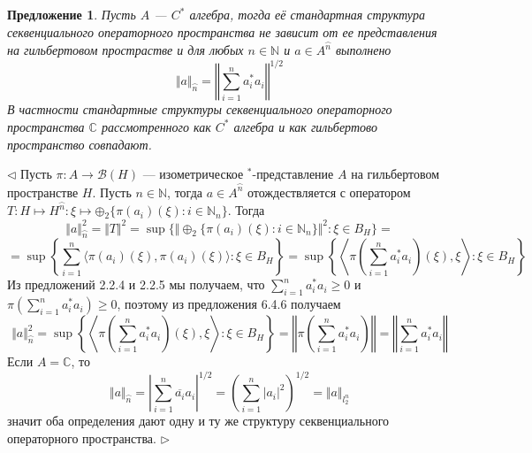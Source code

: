 \documentclass[12pt]{article}
\newtheorem{proposition}[theorem]{Предложение}
\newenvironment{proof}{\par $\triangleleft$}{$\triangleright$}
\begin{document}
\begin{proposition}\label{PrCstarAlgSQ} Пусть $A$ --- $C^*$ алгебра, тогда её стандартная структура секвенциального операторного пространства не зависит от ее представления на гильбертовом прострастве и для любых $n\in\mathbb{N}$ и $a\in A^{\wideparen{n}}$ выполнено
$$
\Vert a\Vert_{\wideparen{n}}=\left\Vert\sum\limits_{i=1}^n a_i^*a_i\right\Vert^{1/2}
$$
В частности стандартные структуры секвенциального операторного пространства $\mathbb{C}$ рассмотренного как $C^*$ алгебра и как гильбертово пространство совпадают.
\end{proposition}
\begin{proof} Пусть $\pi:A\to\mathcal{B}(H)$ --- изометрическое ${}^*$-представление $A$ на гильбертовом пространстве $H$. Пусть $n\in\mathbb{N}$, тогда $a\in A^{\wideparen{n}}$ отождествляется с оператором $T:H\mapsto H^{\wideparen{n}}:\xi\mapsto \oplus{}_2\{\pi(a_i)(\xi):i\in\mathbb{N}_n\}$. Тогда 
$$
\Vert a\Vert_{\wideparen{n}}^2
=\Vert T\Vert^2
=\sup\{\Vert \oplus_2\{\pi(a_i)(\xi):i\in\mathbb{N}_n\}\Vert^2:\xi\in B_H\}=
$$
$$
=\sup\left\{ \sum\limits_{i=1}^n\langle \pi(a_i)(\xi),\pi(a_i)(\xi)\rangle:\xi\in B_H\right\}
=\sup\left\{ \left\langle \pi\left(\sum\limits_{i=1}^n a_i^*a_i\right)(\xi),\xi\right\rangle:\xi\in B_H\right\}
$$
Из предложений 2.2.4 и 2.2.5 \cite{MurphCstarOpTh} мы получаем, что $\sum_{i=1}^n a_i^* a_i\geq 0$ и $\pi(\sum_{i=1}^n a_i^* a_i)\geq 0$, поэтому из предложения 6.4.6 \cite{HelFA} получаем
$$
\Vert a\Vert_{\wideparen{n}}^2
=\sup\left\{ \left\langle \pi\left(\sum\limits_{i=1}^n a_i^*a_i\right)(\xi),\xi\right\rangle:\xi\in B_H\right\}
=\left\Vert \pi\left(\sum\limits_{i=1}^n a_i^*a_i\right)\right\Vert
=\left\Vert \sum\limits_{i=1}^n a_i^*a_i\right\Vert
$$
Если $A=\mathbb{C}$, то
$$
\Vert a\Vert_{\wideparen{n}}
=\left| \sum\limits_{i=1}^n \overline{a_i}a_i\right|^{1/2}
=\left(\sum\limits_{i=1}^n |a_i|^2\right)^{1/2}
=\Vert a\Vert_{l_2^n}
$$
значит оба определения дают одну и  ту же структуру секвенциального операторного пространства.
\end{proof}
\end{document}
